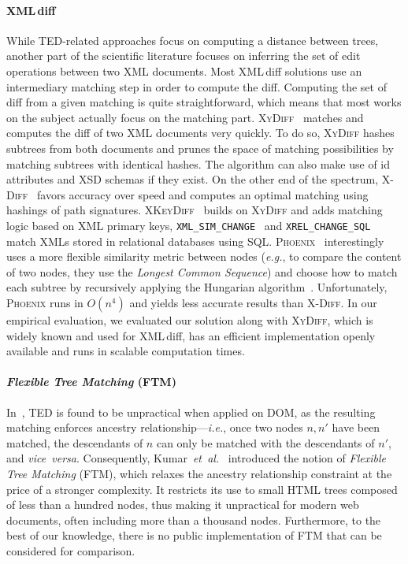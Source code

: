 \paragraph{\bf XML\,diff}\label{sec:xmldiff}
While TED-related approaches focus on computing a distance between trees, another part of the scientific literature focuses on inferring the set of edit operations between two XML documents.
Most XML\,diff solutions use an intermediary matching step in order to compute the diff.
Computing the set of diff from a given matching is quite straightforward, which means that most works on the subject actually focus on the matching part.
\textsc{XyDiff}~\cite{Cobena2002DetectingDocuments} matches and computes the diff of two XML documents very quickly.
To do so, \textsc{XyDiff} hashes subtrees from both documents and prunes the space of matching possibilities by matching subtrees with identical hashes.
The algorithm can also make use of id attributes and XSD schemas if they exist.
On the other end of the spectrum, \textsc{X-Diff}~\cite{wang2003x} favors accuracy over speed and computes an optimal matching using hashings of path signatures.
\textsc{XKeyDiff}~\cite{dos2007semantical} builds on \textsc{XyDiff} and adds matching logic based on XML primary keys, \texttt{XML\_SIM\_CHANGE}~\cite{viyanon2010xml} and \texttt{XREL\_CHANGE\_SQL}~\cite{sundaram2012change} match XMLs stored in relational databases using SQL. 
\textsc{Phoenix}~\cite{oliveira2018efficient} interestingly uses a more flexible similarity metric between nodes (\emph{e.g.}, to compare the content of two nodes, they use the \emph{Longest Common Sequence}) and choose how to match each subtree by recursively applying the Hungarian algorithm~\cite{kuhn1955hungarian}.
Unfortunately, \textsc{Phoenix} runs in $O(n^4)$ and yields less accurate results than \textsc{X-Diff}.
In our empirical evaluation, we evaluated our solution along with \textsc{XyDiff}, which is widely known and used for XML\,diff, has an efficient implementation openly available and runs in scalable computation times.

\paragraph{\bf \emph{Flexible Tree Matching} (FTM)}
In~\cite{Kumar2011_Bricolage}, TED is found to be unpractical when applied on DOM, as the resulting matching enforces ancestry relationship---\emph{i.e.}, once two nodes $n, n'$ have been matched, the descendants of $n$ can only be matched with the descendants of $n'$, and \emph{vice~versa}. 
Consequently, Kumar~\emph{et~al.}~\cite{Kumar2011_Bricolage, Kumar2011_FTM} introduced the notion of \textit{Flexible Tree Matching} (FTM), which relaxes the ancestry relationship constraint at the price of a stronger complexity.
It restricts its use to small HTML trees composed of less than a hundred nodes, thus making it unpractical for modern web documents, often including more than a thousand nodes.
Furthermore, to the best of our knowledge, there is no public implementation of FTM that can be considered for comparison.

